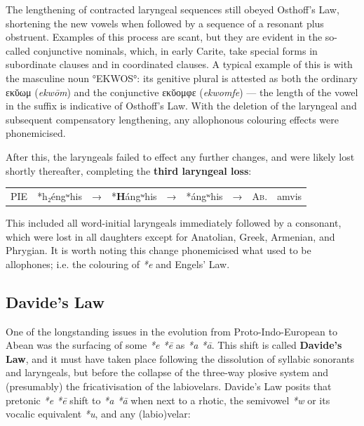 \documentclass[svgnames,x11names,b5paper]{book}
\begin{document}
            The lengthening of contracted laryngeal sequences still obeyed Osthoff's Law, shortening the new vowels when followed by a sequence of a resonant plus obstruent. Examples of this process are scant, but they are evident in the so-called conjunctive nominals, which, in early Carite, take special forms in subordinate clauses and in coordinated clauses. A typical example of this is with the masculine noun °EKWOS°: its genitive plural is attested as both the ordinary εκῠωμ (\textit{ekwōm}) and the conjunctive εκῠομφε (\textit{ekwomfe}) — the length of the vowel in the suffix is indicative of Osthoff's Law. With the deletion of the laryngeal and subsequent compensatory lengthening, any allophonous colouring effects were phonemicised.

        After this, the laryngeals failed to effect any further changes, and were likely lost shortly thereafter, completing the \textbf{third laryngeal loss}:

            \begin{table}[H]
                \begin{center}
                \begin{tabular}{llcllllll}
                \textsc{PIE} & *h₂éngʷhis & → & *\textbf{H}ángʷhis & → & *ángʷhis & → & \textsc{Ab.} & amvis\\
                \end{tabular}
                \end{center}
                \end{table}
        
            This included all word-initial laryngeals immediately followed by a consonant, which were lost in all daughters except for Anatolian, Greek, Armenian, and Phrygian. It is worth noting this change phonemicised what used to be allophones; i.e. the colouring of \textit{*e} and Engels' Law.

            \subsection{Davide's Law}
        
        One of the longstanding issues in the evolution from Proto-Indo-European to Abean was the surfacing of some \textit{*e *ē} as \textit{*a *ā}. This shift is called \textbf{Davide's Law}, and it must have taken place following the dissolution of syllabic sonorants and laryngeals, but before the collapse of the three-way plosive system and (presumably) the fricativisation of the labiovelars. Davide's Law posits that pretonic \textit{*e *ē} shift to \textit{*a *ā} when next to a rhotic, the semivowel \textit{*w} or its vocalic equivalent \textit{*u}, and any (labio)velar:
\end{document}
